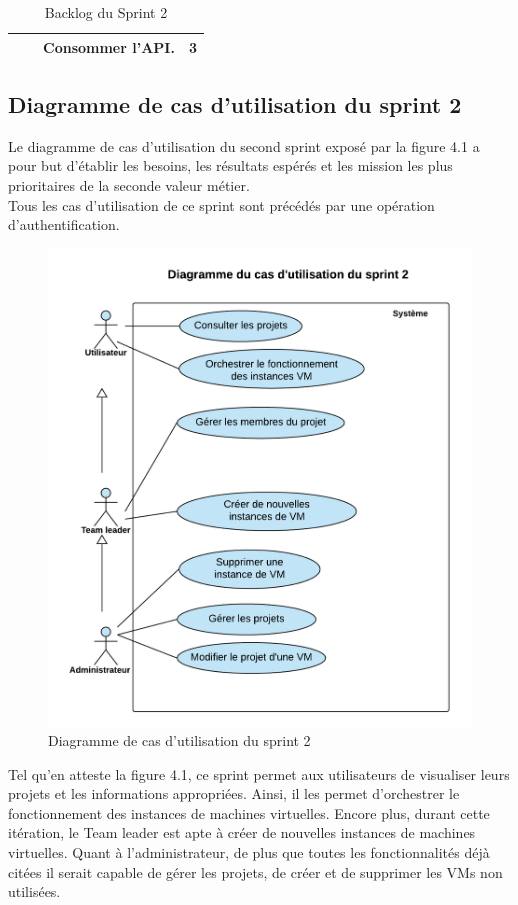 \begin{table}[H]
\begin{tabular}{|l|l|l|l|}
	&                                                                                                                                                                         & Consommer l'API.                                                                                                                                                         & 3              \\ \hline
\end{tabular}

\caption{Backlog du Sprint 2}
\label{Backlog  du Sprint 2}
\end{table}
\subsection{Diagramme de cas d'utilisation du sprint 2}
Le diagramme de cas d'utilisation du second sprint exposé par la figure 4.1 a pour but d'établir les besoins, les résultats espérés et les mission les plus prioritaires de la seconde valeur métier.\\
Tous les cas d'utilisation de ce sprint sont précédés par une opération d'authentification.
	\begin{figure}[H]
	\centering
	\includegraphics[scale=0.7]{DCUsprint2.png}
	\caption{Diagramme de cas d'utilisation du sprint 2}
	\label{Diagramme de cas d'utilisation du sprint 2}
\end{figure} 
Tel qu'en atteste la figure 4.1, ce sprint permet aux utilisateurs de visualiser leurs projets et les informations appropriées. Ainsi, il les permet d'orchestrer le fonctionnement des instances de machines virtuelles. Encore plus, durant cette itération, le Team leader est apte à créer de nouvelles instances de   machines virtuelles.  Quant à l'administrateur, de plus que toutes les fonctionnalités déjà citées il serait capable de gérer les projets, de créer et de supprimer les VMs non utilisées.
